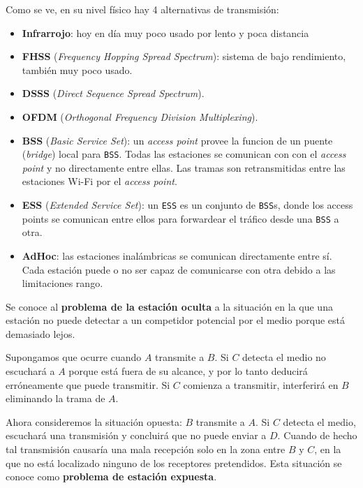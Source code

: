 \documentclass[]{article}
\begin{document}
Como se ve, en su nivel físico hay 4 alternativas de transmisión:
\begin{itemize}
    \item \textbf{Infrarrojo}: hoy en día muy poco usado por lento y poca distancia %
    \item \textbf{FHSS} (\emph{Frequency Hopping Spread Spectrum}): sistema de bajo rendimiento, también muy poco usado.
    \item \textbf{DSSS} (\emph{Direct Sequence Spread Spectrum}).
    \item \textbf{OFDM} (\emph{Orthogonal Frequency Division Multiplexing}). %
\end{itemize}

\begin{itemize}
    \item \textbf{BSS} (\emph{Basic Service Set}): un \emph{access point} provee la funcion de un puente (\emph{bridge}) local para \texttt{BSS}. Todas las estaciones se comunican con con el \emph{access point} y no directamente entre ellas. Las tramas son retransmitidas entre las estaciones Wi-Fi por el \emph{access point}.
    \item \textbf{ESS} (\emph{Extended Service Set}): un \texttt{ESS} es un conjunto de \texttt{BSS}s, donde los access points se comunican entre ellos para forwardear el tráfico desde una \texttt{BSS} a otra.
    \item \textbf{AdHoc}: las estaciones inalámbricas se comunican directamente entre sí. Cada estación puede o no ser capaz de comunicarse con otra debido a las limitaciones rango.
\end{itemize}

Se conoce al \textbf{problema de la estación oculta} a la situación en la que una estación no puede detectar a un competidor potencial por el medio porque está demasiado lejos.

Supongamos que ocurre cuando $A$ transmite a $B$. Si $C$ detecta el medio no escuchará a $A$ porque está fuera de su alcance, y por lo tanto deducirá erróneamente que puede transmitir. Si $C$ comienza a transmitir, interferirá en $B$ eliminando la trama de $A$.


Ahora consideremos la situación opuesta: $B$ transmite a $A$. Si $C$ detecta el medio, escuchará una transmisión y concluirá que no puede enviar a $D$. Cuando de hecho tal transmisión causaría una mala recepción solo en la zona entre $B$ y $C$, en la que no está localizado ninguno de los receptores pretendidos. Esta situación se conoce como \textbf{problema de estación expuesta}.
\end{document}
